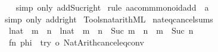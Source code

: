 \begin{isabellebody}
%
\isadelimproof
\ \ %
\endisadelimproof
%
\isatagproof
{}\isamarkupfalse%
\ {\isacharparenleft}{\kern0pt}simp\ only{\isacharcolon}{\kern0pt}\ add{\isacharunderscore}{\kern0pt}Suc{\isacharunderscore}{\kern0pt}right{\isacharparenright}{\kern0pt}%
\endisatagproof
{\isafoldproof}%
%
\isadelimproof
\isanewline
%
\endisadelimproof
\isanewline
{}\isamarkupfalse%
\ rule{}{\isacharcolon}{\kern0pt}\ {\isachardoublequoteopen}{\isacharparenleft}{\kern0pt}a{\isacharcolon}{\kern0pt}{\isacharcolon}{\kern0pt}{\isacharprime}{\kern0pt}a{\isacharcolon}{\kern0pt}{\isacharcolon}{\kern0pt}comm{\isacharunderscore}{\kern0pt}monoid{\isacharunderscore}{\kern0pt}add{\isacharparenright}{\kern0pt}\ {\isasymequiv}\ a\ {\isacharplus}{\kern0pt}\ {}{\isachardoublequoteclose}\isanewline
%
\isadelimproof
\ \ %
\endisadelimproof
%
\isatagproof
{}\isamarkupfalse%
\ {\isacharparenleft}{\kern0pt}simp\ only{\isacharcolon}{\kern0pt}\ add{\isacharunderscore}{\kern0pt}{}{\isacharunderscore}{\kern0pt}right{\isacharparenright}{\kern0pt}%
\endisatagproof
{\isafoldproof}%
%
\isadelimproof
\isanewline
%
\endisadelimproof
\isanewline
{}\isamarkupfalse%
\isanewline
%
\isadelimML
\isanewline
%
\endisadelimML
%
\isatagML
{}\isamarkupfalse%
\ {\isacartoucheopen}Tools{\isacharslash}{\kern0pt}nat{\isacharunderscore}{\kern0pt}arith{\isachardot}{\kern0pt}ML{\isacartoucheclose}\isanewline
\isanewline
{}\isamarkupfalse%
\ nateq{\isacharunderscore}{\kern0pt}cancel{\isacharunderscore}{\kern0pt}sums\isanewline
\ \ {\isacharparenleft}{\kern0pt}{\isachardoublequoteopen}{\isacharparenleft}{\kern0pt}l{\isacharcolon}{\kern0pt}{\isacharcolon}{\kern0pt}nat{\isacharparenright}{\kern0pt}\ {\isacharplus}{\kern0pt}\ m\ {\isacharequal}{\kern0pt}\ n{\isachardoublequoteclose}\ {\isacharbar}{\kern0pt}\ {\isachardoublequoteopen}{\isacharparenleft}{\kern0pt}l{\isacharcolon}{\kern0pt}{\isacharcolon}{\kern0pt}nat{\isacharparenright}{\kern0pt}\ {\isacharequal}{\kern0pt}\ m\ {\isacharplus}{\kern0pt}\ n{\isachardoublequoteclose}\ {\isacharbar}{\kern0pt}\ {\isachardoublequoteopen}Suc\ m\ {\isacharequal}{\kern0pt}\ n{\isachardoublequoteclose}\ {\isacharbar}{\kern0pt}\ {\isachardoublequoteopen}m\ {\isacharequal}{\kern0pt}\ Suc\ n{\isachardoublequoteclose}{\isacharparenright}{\kern0pt}\ {\isacharequal}{\kern0pt}\isanewline
\ \ {\isacartoucheopen}fn\ phi\ {\isacharequal}{\kern0pt}{\isachargreater}{\kern0pt}\ try\ o\ Nat{\isacharunderscore}{\kern0pt}Arith{\isachardot}{\kern0pt}cancel{\isacharunderscore}{\kern0pt}eq{\isacharunderscore}{\kern0pt}conv{\isacartoucheclose}\isanewline

\end{isabellebody}
